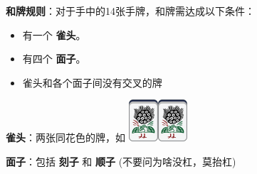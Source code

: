 \documentclass[
	lang=cn,
	color=green
]{elegantbook}
\begin{document}
\begin{remark}
    \hspace{0.15cm} \textbf{和牌规则}：对于手中的14张手牌，和牌需达成以下条件：

    \begin{itemize}
        \item 有一个 \textbf{雀头}。
        \item 有四个 \textbf{面子}。
        \item 雀头和各个面子间没有交叉的牌
    \end{itemize}

    \hspace{0.15cm} \textbf{雀头}：两张同花色的牌，如 \includegraphics[scale=0.5]{images/mahjong/1s.png}\includegraphics[scale=0.5]{images/mahjong/1s.png}

    \hspace{0.15cm} \textbf{面子}：包括 \textbf{刻子} 和 \textbf{顺子} (不要问为啥没杠，莫抬杠)


\end{remark}
\end{document}
